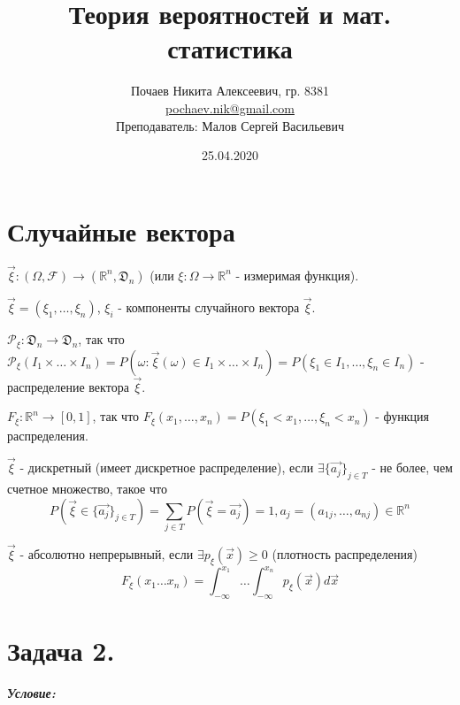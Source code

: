 

\title{Теория вероятностей и мат. статистика}
\date{25.04.2020}
\author{Почаев Никита Алексеевич, гр. 8381 \\ \href{mailto:pochaev.nik@gmail.com}{pochaev.nik@gmail.com} \\ Преподаватель: Малов Сергей Васильевич}


	
\renewcommand{\figurename}{Рисунок}

\maketitle

\section*{Случайные вектора}

$\vec{\xi}: (\Omega, \mathcal{F}) \to (\mathbb{R}^n, \mathfrak{D}_n)$ (или $\xi: \Omega \to \mathbb{R}^n$ - измеримая функция).

$\vec{\xi} = (\xi_1, \dots, \xi_n)$, $\xi_i$ - компоненты случайного вектора $\vec{\xi}$.

$\mathcal{P}_{\xi}: \mathfrak{D}_n \to \mathfrak{D}_n$, так что $\mathcal{P}_{\xi}(I_1 \times \dots \times I_n) = P(\omega: \vec{\xi}(\omega) \in I_1 \times \dots \times I_n) = P(\xi_1 \in I_1, \dots, \xi_n \in I_n)$ - распределение вектора $\vec{\xi}$.

$F_{\xi}: \mathbb{R}^n \to [0,1]$, так что $F_{\xi}(x_1, \dots, x_n) = P(\xi_1 < x_1, \dots, \xi_n < x_n)$ - функция распределения.

$\vec{\xi}$ - дискретный (имеет дискретное распределение), если $\exists \{ \vec{a_j} \}_{j \in T}$ - не более, чем счетное множество, такое что
\[ P(\vec{\xi} \in \{ \vec{a_j} \}_{j \in T}) = \sum_{j \in T} P(\vec{\xi} = \vec{a_j}) = 1, a_j = (a_{1j}, \dots, a_{nj}) \in \mathbb{R}^n \]

$\vec{\xi}$ - абсолютно непрерывный, если $\exists p_{\xi}(\vec{x}) \ge 0$ (плотность распределения)
\[ F_{\xi} (x_1 \dots x_n) = \int_{- \infty}^{x_1} \dots \int_{- \infty}^{x_n} p_{\xi} (\vec{x}) d \vec{x} \]

\section*{Задача 2.}

\noindent\textit{\textbf{Условие:}}

